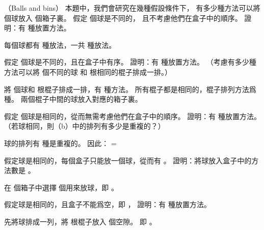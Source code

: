 \startsubject[
  title={Problems},
]

\startPROBLEM
（Balls and bins）
本題中，我們會研究在幾種假設條件下，
有多少種方法可以將  個球放入  個箱子裏。
\startigBase[a]\startitem
假定  個球是不同的，
且不考慮他們在盒子中的順序。
證明：有  種放置方法。
\stopitem\stopigBase

\startANSWER
每個球都有  種放法，一共  種放法。
\stopANSWER

\startigBase[continue]\startitem
假定  個球是不同的，且在盒子中有序。
證明：有  種放置方法。
（\hint 考慮有多少種方法可以將  個不同的球
和  根相同的棍子排成一排。）
\stopitem\stopigBase

\startANSWER
將  個球和  根棍子排成一排，有  種方法。
所有棍子都是相同的，棍子排列方法爲  種。
兩個棍子中間的球放入對應的箱子裏。
\stopANSWER

\startigBase[continue]\startitem
假定  個球是相同的，從而無需考慮他們在盒子中的順序。
證明：有  種放置方法。
（\hint 若球相同，則（b）中的排列有多少是重複的？）
\stopitem\stopigBase

\startANSWER
球的排列有  種是重複的。
因此：
\startformula
{} = 
\stopformula
\stopANSWER

\startigBase[continue]\startitem
假定球是相同的，每個盒子只能放一個球，從而有 。
證明：將球放入盒子中的方法數是 。
\stopitem\stopigBase

\startANSWER
在  個箱子中選擇  個用來放球，即 。
\stopANSWER

\startigBase[continue]\startitem
假定球是相同的，且盒子不能爲空，即 ，
證明：有  種放置方法。
\stopitem\stopigBase

\startANSWER
先將球排成一列，將  根棍子放入  個空隙。
即 。
\stopANSWER
\stopPROBLEM

\stopsubject%
